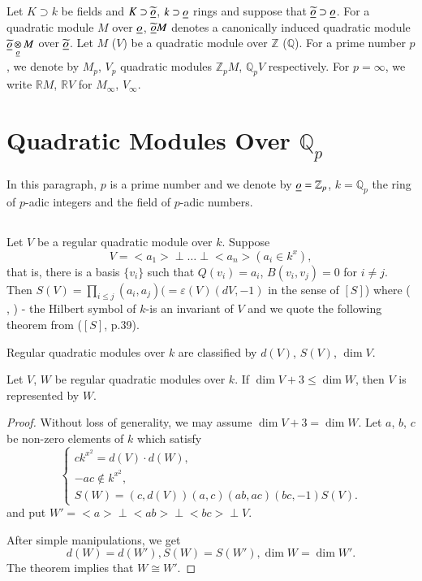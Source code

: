\subsubsection{}\label{c2:subsec2.0.7}
Let $K\supset k$ be fields and $K\supset \underline{\widetilde{o}}$,
$k\supset\underline{o}$ rings and suppose that $\underline{\widetilde{o}}\supset
\underline{o}$. For a quadratic module $M$ over $\underline{o}$,
$\underline{\widetilde{o}}M$ denotes a canonically induced quadratic module
$\underline{\widetilde{o}}\mathop{\otimes}\limits_{\underline{o}}M$ over
$\underline{\widetilde{o}}$. Let $M$ (\resp $V$) be a quadratic module over
$\mathbb{Z}$ (\resp $\mathbb{Q}$). For a prime number $p$, we denote
by $M_{p}$, $V_{p}$ quadratic modules $\mathbb{Z}_{p}M$,
$\mathbb{Q}_{p}V$ respectively. For $p=\infty$, we write
$\mathbb{R}M$, $\mathbb{R}V$ for $M_{\infty}$, $V_{\infty}$.

\section{Quadratic Modules Over $\mathbb{Q}_{p}$}\label{c2:sec-2.1}

In this paragraph, $p$ is a prime number and we denote by
$\underline{o}=\mathbb{Z}_{p}$, $k=\mathbb{Q}_{p}$ the ring of $p$-adic
integers and the field of $p$-adic numbers.

\subsection{}\label{c2:subsec2.1.1}
Let $V$ be a regular quadratic module over $k$. Suppose
$$
V=<a_{1}>\perp\ldots\perp <a_{n}>(a_{i}\in k^{x}),
$$
that is, there is a basis $\{v_{i}\}$ such that $Q(v_{i})=a_{i}$,
$B(v_{i},v_{j})=0$ for $i\neq j$. Then $S(V)=\prod\limits_{i\leq
  j}(a_{i},a_{j})(=\varepsilon(V)(dV,-1)$ in the sense of $[S]$) where ( ,
) - the Hilbert symbol of $k$-is an invariant of $V$ and we quote the
following theorem from ($[S]$, p.39).

\begin{theorem}\label{c2:thm-2.1}
Regular quadratic modules over $k$ are classified by $d(V)$, $S(V)$,
$\dim V$.
\end{theorem}

\begin{coro*}
Let $V$, $W$ be regular quadratic modules over $k$. If\pageoriginale
$\dim V+3\leq \dim W$, then $V$ is represented by $W$.
\end{coro*}

\begin{proof}
Without loss of generality, we may assume $\dim V+3=\dim W$. Let $a$,
$b$, $c$ be non-zero elements of $k$ which satisfy
$$
\begin{cases}
ck^{x^{2}}=d(V)\cdot d(W),\\
-ac \not\in k^{x^{2}},\\
S(W)=(c,d(V))(a,c)(ab,ac)(bc,-1)S(V).
\end{cases}
$$
and put $W'=<a>\perp <ab>\perp <bc>\perp V$.

After simple manipulations, we get
$$
d(W)=d(W'), S(W)=S(W'), \dim W=\dim W'.
$$
The theorem implies that $W\cong W'$. 
\end{proof}


